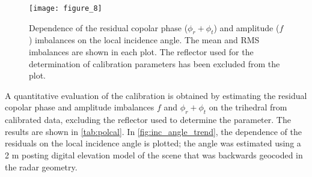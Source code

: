 \begin{figure}[ht!]
	\centering
	\texttt{[image: figure\_8]}
	\caption{Dependence of the residual copolar phase ($\phi_r + \phi_t$) and amplitude  ($f$) imbalances on the local incidence angle. The mean and RMS imbalances are shown in each plot. The reflector used for the determination of calibration parameters has been excluded from the plot.}
	\label{fig:inc_angle_trend}
\end{figure}
A quantitative evaluation of the calibration is obtained by estimating the residual copolar phase and amplitude imbalances $f$ and $\phi_r + \phi_t$ on the trihedral from calibrated data, excluding the reflector used to determine the parameter. The results are shown in \autoref{tab:polcal}.
In \autoref{fig:inc_angle_trend}, the dependence of the residuals on the local incidence angle is plotted; the angle was estimated using a 2 m posting digital elevation model of the scene that was backwards geocoded in the radar geometry.